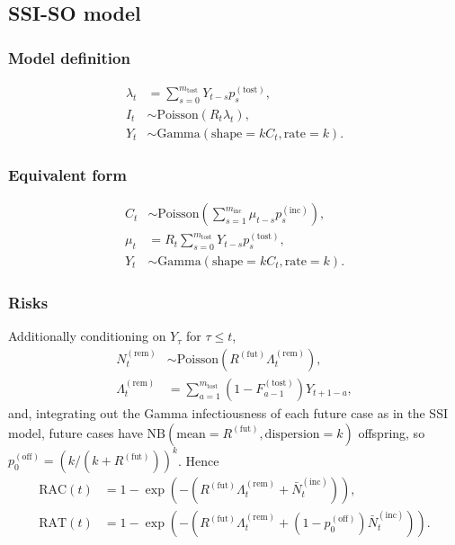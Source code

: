 \documentclass{article}
\newcommand{\PoissonDist}[1]{\mathrm{Poisson}\left(#1\right)}
\newcommand{\NBDist}[2]{\mathrm{NB}\left(\mathrm{mean}=#1,
\mathrm{dispersion}=#2\right)}
\newcommand{\GammaDist}[2]{\mathrm{Gamma}\left(\mathrm{shape}=#1,
\mathrm{rate}=#2\right)}
\newcommand{\incPMF}{p^{(\mathrm{inc})}}
\newcommand{\tostPMF}{p^{(\mathrm{tost})}}
\newcommand{\offPMF}{p^{(\mathrm{off})}}
\newcommand{\tostCDF}{F^{(\mathrm{tost})}}
\newcommand{\Rfut}{R^{(\mathrm{fut})}}
\newcommand{\RAC}{\mathrm{RAC}}
\newcommand{\RAT}{\mathrm{RAT}}
\begin{document}
\subsection{SSI-SO model}
\subsubsection{Model definition}

\begin{align}
  \lambda_{t} &= \sum_{s=0}^{m_{\mathrm{tost}}} Y_{t-s} \tostPMF_s,\\
  I_t &\sim \PoissonDist{R_{t}\lambda_{t}},\\
  Y_t &\sim \GammaDist{kC_t}{k}.
\end{align}

\subsubsection{Equivalent form}

\begin{align}
  C_t &\sim \PoissonDist{\sum_{s=1}^{m_{\mathrm{inc}}}
  \mu_{t-s} \incPMF_{s}},\\
  \mu_t &= R_{t}\sum_{s=0}^{m_{\mathrm{tost}}}
  Y_{t-s} \tostPMF_{s},\\
  Y_t &\sim \GammaDist{kC_t}{k}.
\end{align}

\subsubsection{Risks}

Additionally conditioning on \(Y_\tau\) for \(\tau\leq t\),
\begin{align}
  N^{(\mathrm{rem})}_{t} &\sim
  \PoissonDist{\Rfut\Lambda^{(\mathrm{rem})}_{t}},\\
  \Lambda^{(\mathrm{rem})}_{t}&=\sum_{a=1}^{m_{\mathrm{tost}}}
  (1-\tostCDF_{a-1})Y_{t+1-a},
\end{align}
and, integrating out the Gamma infectiousness of each future case as in
the SSI model, future cases have \(\NBDist{\Rfut}{k}\) offspring, so
\(\offPMF_0=\left(k/(k+\Rfut)\right)^{k}\). Hence
\begin{align}
  \RAC(t)&=1-\exp\left(-\left(\Rfut\Lambda^{(\mathrm{rem})}_{t}+\bar
  N_t^{(\mathrm{inc})}\right)\right),\\
  \RAT(t)&=1-\exp\left(-\left(\Rfut\Lambda^{(\mathrm{rem})}_{t}+\left(1-\offPMF_0\right)\bar
  N_t^{(\mathrm{inc})}\right)\right).
\end{align}
\end{document}
